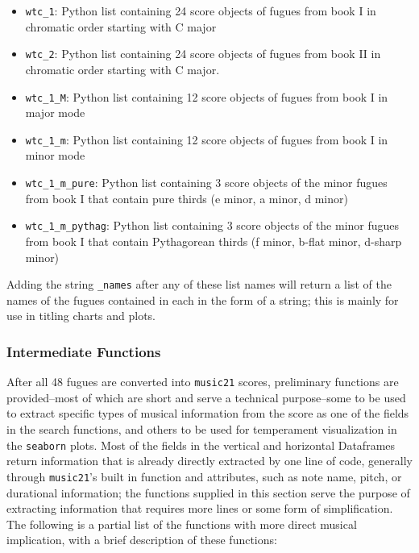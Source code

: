 \begin{itemize}
\tightlist
\item
  \texttt{wtc\_1}: Python list containing 24 score objects of fugues
  from book I in chromatic order starting with C major
\item
  \texttt{wtc\_2}: Python list containing 24 score objects of fugues
  from book II in chromatic order starting with C major.
\item
  \texttt{wtc\_1\_M}: Python list containing 12 score objects of fugues
  from book I in major mode
\item
  \texttt{wtc\_1\_m}: Python list containing 12 score objects of fugues
  from book I in minor mode
\item
  \texttt{wtc\_1\_m\_pure}: Python list containing 3 score objects of
  the minor fugues from book I that contain pure thirds (e minor, a
  minor, d minor)
\item
  \texttt{wtc\_1\_m\_pythag}: Python list containing 3 score objects of
  the minor fugues from book I that contain Pythagorean thirds (f minor,
  b-flat minor, d-sharp minor)
\end{itemize}

Adding the string \texttt{\textquotesingle{}\_names\textquotesingle{}}
after any of these list names will return a list of the names of the
fugues contained in each in the form of a string; this is mainly for use
in titling charts and plots.

\subsubsection{Intermediate Functions}\label{intermediate-functions}

After all 48 fugues are converted into \texttt{music21} scores,
preliminary functions are provided--most of which are short and serve
a technical purpose--some to be used to extract specific types of
musical information from the score as one of the fields in the search
functions, and others to be used for temperament visualization in the
\texttt{seaborn} plots. Most of the fields in the vertical and
horizontal Dataframes return information that is already directly
extracted by one line of code, generally through \texttt{music21}'s
built in function and attributes, such as note name, pitch, or
durational information; the functions supplied in this section serve the
purpose of extracting information that requires more lines or some form
of simplification. The following is a partial list of the functions with
more direct musical implication, with a brief description of these
functions:

